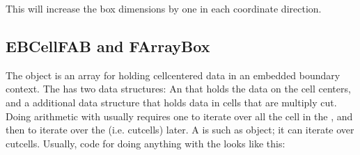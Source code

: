 \documentclass[letterpaper,10pt,english]{sphinxmanual}
\begin{document}
\begin{sphinxVerbatim}[commandchars=\\\{\},formatcom=\scriptsize]
   
                
\end{sphinxVerbatim}

This will increase the box dimensions by one in each coordinate direction.


\subsection{EBCellFAB and FArrayBox}
\label{\detokenize{Source/ChomboBasics:ebcellfab-and-farraybox}}
The  object is an array for holding cell\sphinxhyphen{}centered data in an embedded boundary context.
The  has two data structures: An  that holds the data on the cell centers, and a additional data structure that holds data in cells that are multiply cut.
Doing arithmetic with  usually requires one to iterate over all the cell in the , and then to iterate over the  (i.e. cut\sphinxhyphen{}cells) later.
A  is such as object; it can iterate over cut\sphinxhyphen{}cells.
Usually, code for doing anything with the  looks like this:

\begin{sphinxVerbatim}[commandchars=\\\{\},formatcom=\scriptsize]

    
\end{sphinxVerbatim}
\end{document}
